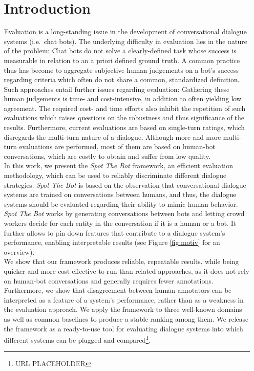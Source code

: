 \documentclass[11pt,a4paper]{article}
\begin{document}
\section{Introduction}\label{sec:intro}
 Evaluation is a long-standing issue in the development of conversational dialogue systems (i.e.\ chat bots). The underlying difficulty in evaluation lies in the nature of the problem: Chat bots do not solve a clearly-defined task whose success is measurable in relation to an a priori defined ground truth. A common practice thus has become to aggregate subjective human judgements on a bot's success regarding criteria which often do not share a common, standardized definition. Such approaches entail further issues regarding evaluation: Gathering these human judgements is time- and cost-intensive, in addition to often yielding low agreement. The required cost- and time efforts also inhibit the repetition of such evaluations which raises questions on the robustness and thus significance of the results. 
Furthermore, current evaluations are based on single-turn ratings, which disregards the multi-turn nature of a dialogue. Although more and more multi-turn evaluations are performed, most of them are based on human-bot conversations, which are costly to obtain and suffer from low quality. \\
  In this work, we present the \emph{Spot The Bot} framework, an efficient evaluation methodology, which can be used to reliably discriminate different dialogue strategies. \emph{Spot The Bot} is based on the observation that conversational dialogue systems are trained on conversations between humans, and thus, the dialogue systems should be evaluated regarding their ability to mimic human behavior. \emph{Spot The Bot} works by  generating conversations between bots and letting crowd workers decide for each entity in the conversation if it is a human or a bot. It further allows to pin down features that contribute to a dialogue system's performance, enabling interpretable results (see Figure \ref{fig:motiv} for an overview). \\
 We show that our framework produces reliable, repeatable results, while being quicker and more cost-effective to run than related approaches, as it does not rely on human-bot conversations and generally requires fewer annotations. Furthermore, we show that disagreement between human annotators can be interpreted as a feature of a system's performance, rather than as a weakness in the evaluation approach. We apply the framework to three well-known domains as well as common baselines to produce a stable ranking among them. We release the framework as a ready-to-use tool for evaluating dialogue systems into which different systems can be plugged and compared\footnote{URL PLACEHOLDER}.
\end{document}
